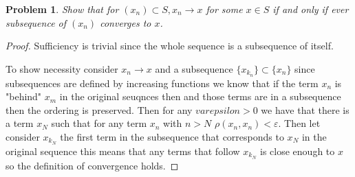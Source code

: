 \documentclass{article}
\newtheorem{problem}{Problem}
\begin{document}
\begin{problem}
    Show that for $\left(x_{n}\right) \subset S, x_{n} \rightarrow x$ for some $x \in S$ if and only if ever subsequence of $\left(x_{n}\right)$ converges to $x$.
\end{problem}

\begin{proof}
    Sufficiency is trivial since the whole sequence is a subsequence of itself.

    To show necessity consider $x_n\to x$ and a subsequence $\{x_{k_n}\}\subset\{x_{n}\}$ since subsequences are defined by increasing functions we know that if the term $x_n$ is "behind" $x_m$ in the original seuqnces then and those terms are in a subsequence then the ordering is preserved. Then for any $varepsilon>0$ we have that there is a term $x_N$ such that for any term  $x_n$ with $n>N$ $\rho(x_n, x_n)<\varepsilon$. Then let consider $x_{k_{N}}$ the first term in the subsequence that corresponds to $x_N$ in the original sequence this means that any terms that follow $x_{k_{N}}$ is close enough to $x$ so the definition of convergence holds.
\end{proof}
\end{document}
